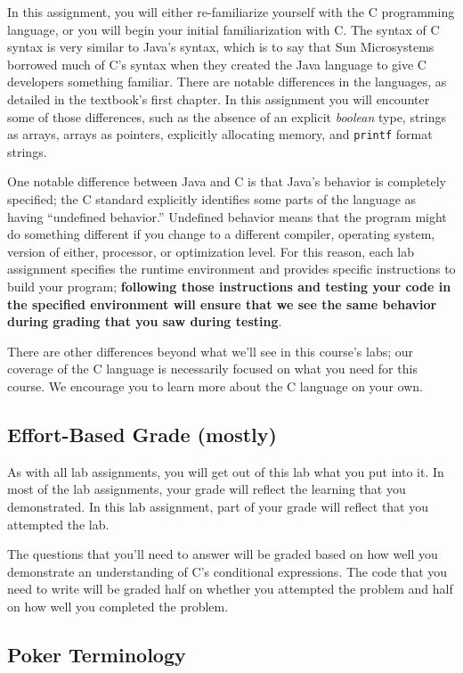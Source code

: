 In this assignment, you will either re-familiarize yourself with the C programming language, or you will begin your initial familiarization with C\@.
The syntax of C syntax is very similar to Java's syntax, which is to say that Sun Microsystems borrowed much of C's syntax when they created the Java language to give C developers something familiar.
There are notable differences in the languages, as detailed in the textbook's first chapter.
In this assignment you will encounter some of those differences, such as the absence of an explicit \textit{boolean} type, strings as arrays, arrays as pointers, explicitly allocating memory, and \lstinline{printf} format strings.

One notable difference between Java and C is that Java's behavior is completely specified;
the C standard explicitly identifies some parts of the language as having ``undefined behavior.''
Undefined behavior means that the program might do something different if you change to a different compiler, operating system, version of either, processor, or optimization level.
For this reason, each lab assignment specifies the runtime environment and provides specific instructions to build your program;
\textbf{following those instructions and testing your code in the specified environment will ensure that we see the same behavior during grading that you saw during testing}.

There are other differences beyond what we'll see in this course's labs;
our coverage of the C language is necessarily focused on what you need for this course.
We encourage you to learn more about the C language on your own.

\subsection{Effort-Based Grade (mostly)}

As with all lab assignments, you will get out of this lab what you put into it.
In most of the lab assignments, your grade will reflect the learning that you demonstrated.
In this lab assignment, part of your grade will reflect that you attempted the lab.

The questions that you'll need to answer will be graded based on how well you demonstrate an understanding of C's conditional expressions.
The code that you need to write will be graded half on whether you attempted the problem and half on how well you completed the problem.

\subsection{Poker Terminology} \label{subsec:terminology}

